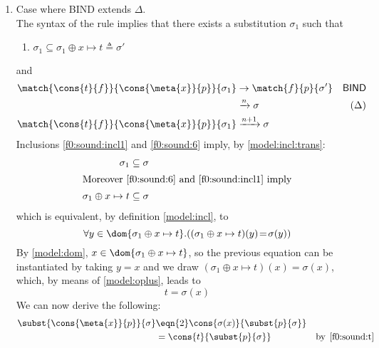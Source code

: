 \begin{enumerate}
\begin{enumerate}
      \item Case where \textsf{BIND} extends \(\Delta\).\\ The syntax
        of the rule implies that there exists a substitution
        \(\sigma_1\) such that
        \begin{enumerate}

          \item \(\sigma_1 \subseteq \sigma_1 \oplus x \mapsto t \triangleq
          \sigma'\) \label{f0:sound:incl1}

        \end{enumerate}
        and
        \begin{align}
           \match{\cons{t}{f}}{\cons{\meta{x}}{p}}{\sigma_1}
          &\rightarrow
           \match{f}{p}{\sigma'}
          &\textsf{BIND} \notag\\
          &\xrightarrow{n} \sigma
          & (\Delta) \notag\\
           \match{\cons{t}{f}}{\cons{\meta{x}}{p}}{\sigma_1}
           &\xrightarrow{n+1} \sigma \label{f0:sound:BIND}
        \end{align}
        Inclusions \ref{f0:sound:incl1} and \eqref{f0:sound:6} imply, by
        \eqref{model:incl:trans}:
        \begin{align}
          \sigma_1 \subseteq \sigma \label{f0:sound:incl2}\\
          \intertext{Moreover \eqref{f0:sound:6} and \ref{f0:sound:incl1}
            imply}
          \sigma_1 \oplus x \mapsto t \subseteq \sigma\notag
        \end{align}
        which is equivalent, by definition \eqref{model:incl}, to
        \[
        \forall y \in \dom{\sigma_1 \oplus x \mapsto t}.((\sigma_1
        \oplus x \mapsto t)(y) \!=\! \sigma(y))
        \] 
        By \eqref{model:dom}, \(x \in \dom{\sigma_1 \oplus x \mapsto
          t}\), so the previous equation can be instantiated by taking
        \(y = x\) and we draw \((\sigma_1 \oplus x \mapsto t)(x) =
        \sigma(x)\), which, by means of \eqref{model:oplus}, leads to
        \begin{equation}
          t = \sigma(x) \label{f0:sound:t}
        \end{equation}
        We can now derive the following:
        \begin{align}
            \subst{\cons{\meta{x}}{p}}{\sigma}
          &\eqn{2} \cons{\sigma(x)}{\subst{p}{\sigma}}\notag\\
          &= \cons{t}{\subst{p}{\sigma}}
          &\text{by} \,\; \eqref{f0:sound:t}\notag\\

\end{align}
\end{enumerate}
\end{enumerate}
